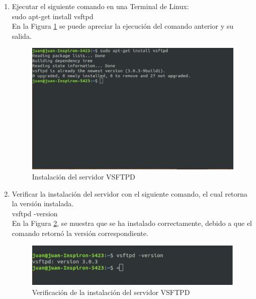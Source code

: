\begin{enumerate}
    \item Ejecutar el siguiente comando en una Terminal de Linux:\\
    
    sudo apt-get install vsftpd\\
    
    En la Figura \ref{fig:ftp1} se puede apreciar la ejecución del comando anterior y su salida.
    
    \begin{figure}[H]
        \centering
        \includegraphics[scale=.97]{imagenes/primero/paso1_ftp.PNG}
        \caption{Instalación del servidor VSFTPD}
        \label{fig:ftp1}
    \end{figure}
    
    \item Verificar la instalación del servidor con el siguiente comando, el cual retorna la versión instalada.\\
    
    vsftpd -version\\
    
    En la Figura \ref{fig:ftp2}, se muestra que se ha instalado correctamente, debido a que el comando retornó la versión correspondiente.

    \begin{figure}[H]
        \centering
        \includegraphics[scale=.97]{imagenes/primero/paso2_ftp.PNG}
        \caption{Verificación de la instalación del servidor VSFTPD}
        \label{fig:ftp2}
    \end{figure}
    

\end{enumerate}
